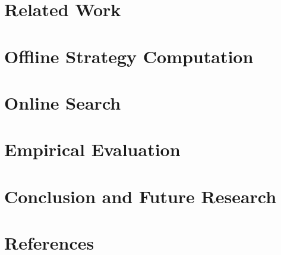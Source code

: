 \documentclass[preprint,12pt]{elsarticle}
\newcommand{\reviewchange}[1]{{\color{black}#1}}
\newcounter{bbNoteCounter}
\newcommand{\bbosansky}[1]{{\small \color{orange} $\blacktriangle$ \refstepcounter{bbNoteCounter}\textsf{[BB]$_{\arabic{bbNoteCounter}}$:{#1}}}}
\begin{document}


\section{Related Work} \label{sec:relwork}



\section{Offline Strategy Computation} \label{sec:offline}



\section{Online Search} \label{sec:online}




\section{Empirical Evaluation} \label{sec:eval}



\section{Conclusion and Future Research} \label{sec:conc}




\section*{References}











\end{document}
